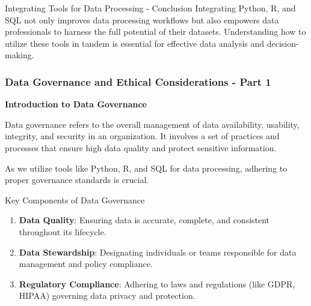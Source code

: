 \documentclass[aspectratio=169]{beamer}
\begin{document}
\begin{frame}[fragile]{Integrating Tools for Data Processing - Conclusion}
  Integrating Python, R, and SQL not only improves data processing workflows but also empowers data professionals to harness the full potential of their datasets. Understanding how to utilize these tools in tandem is essential for effective data analysis and decision-making.
\end{frame}

\begin{frame}[fragile]
    \frametitle{Data Governance and Ethical Considerations - Part 1}
    \textbf{Introduction to Data Governance}
    
    Data governance refers to the overall management of data availability, usability, integrity, and security in an organization. It involves a set of practices and processes that ensure high data quality and protect sensitive information.
    
    As we utilize tools like Python, R, and SQL for data processing, adhering to proper governance standards is crucial.
    
    \begin{block}{Key Components of Data Governance}
        \begin{enumerate}
            \item \textbf{Data Quality}: Ensuring data is accurate, complete, and consistent throughout its lifecycle.
            \item \textbf{Data Stewardship}: Designating individuals or teams responsible for data management and policy compliance.
            \item \textbf{Regulatory Compliance}: Adhering to laws and regulations (like GDPR, HIPAA) governing data privacy and protection.
        \end{enumerate}
    \end{block}
\end{frame}
\end{document}
